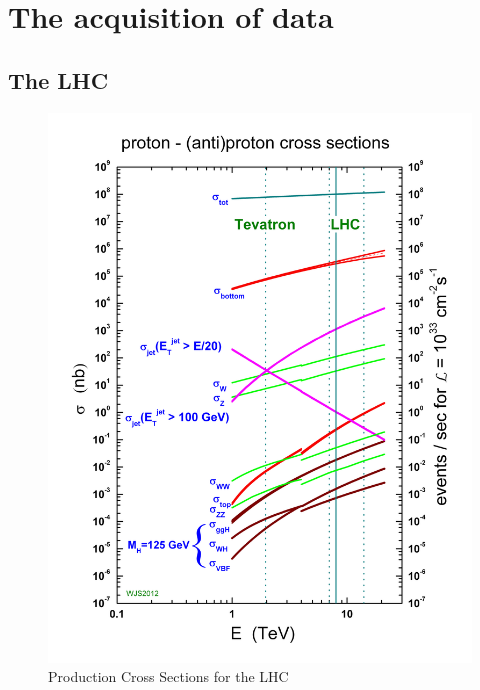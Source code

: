 \chapter{The acquisition of data}

\section{The LHC}

\begin{figure}[h!]
  \includegraphics[width=.7\textwidth]{figures/lhc_decay_modes.jpg}
  \caption{Production Cross Sections for the LHC}
  \label{fig:lhc_decay_modes}
\end{figure}


